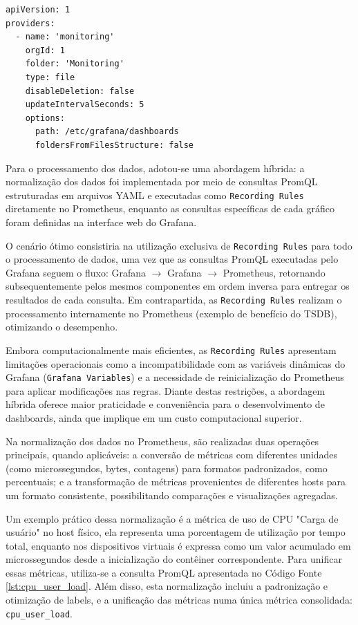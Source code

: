 \begin{lstlisting}[caption={Arquivo dashboards.yml}, label={lst:dashboards-yml}]
apiVersion: 1
providers:
  - name: 'monitoring'
    orgId: 1
    folder: 'Monitoring'
    type: file
    disableDeletion: false
    updateIntervalSeconds: 5
    options:
      path: /etc/grafana/dashboards
      foldersFromFilesStructure: false
\end{lstlisting}

Para o processamento dos dados, adotou-se uma abordagem híbrida: a normalização dos dados foi implementada por meio de consultas PromQL estruturadas em arquivos YAML e executadas como \verb|Recording Rules| diretamente no Prometheus, enquanto as consultas específicas de cada gráfico foram definidas na interface web do Grafana.

O cenário ótimo consistiria na utilização exclusiva de \texttt{Recording Rules} para todo o processamento de dados, uma vez que as consultas PromQL executadas pelo Grafana seguem o fluxo: Grafana  $\rightarrow$ Grafana  $\rightarrow$ Prometheus, retornando subsequentemente pelos mesmos componentes em ordem inversa para entregar os resultados de cada consulta. Em contrapartida, as \verb|Recording Rules| realizam o processamento internamente no Prometheus (exemplo de benefício do TSDB), otimizando o desempenho.

Embora computacionalmente mais eficientes, as \texttt{Recording Rules} apresentam limitações operacionais como a incompatibilidade com as variáveis dinâmicas do Grafana (\verb|Grafana Variables|) e a necessidade de reinicialização do Prometheus para aplicar modificações nas regras. Diante destas restrições, a abordagem híbrida oferece maior praticidade e conveniência para o desenvolvimento de dashboards, ainda que implique em um custo computacional superior.

Na normalização dos dados no Prometheus, são realizadas duas operações principais, quando aplicáveis: a conversão de métricas com diferentes unidades (como microssegundos, bytes, contagens) para formatos padronizados, como percentuais; e a transformação de métricas provenientes de diferentes hosts para um formato consistente, possibilitando comparações e visualizações agregadas.

Um exemplo prático dessa normalização é a métrica de uso de CPU "Carga de usuário" no host físico, ela representa uma porcentagem de utilização por tempo total, enquanto nos dispositivos virtuais é expressa como um valor acumulado em microssegundos desde a inicialização do contêiner correspondente. Para unificar essas métricas, utiliza-se a consulta PromQL apresentada no Código Fonte \ref{lst:cpu_user_load}. Além disso, esta normalização incluiu a padronização e otimização de labels, e a unificação das métricas numa única métrica consolidada: \verb|cpu_user_load|.

